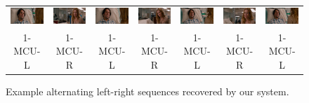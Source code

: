 \begin{figure}
\begin{center}
\begin{tabular}{c c c c c c c}

\includegraphics[width=0.11\linewidth]
  {fig/pat1/thisIs40/01.jpg}
& \includegraphics[width=0.11\linewidth]
  {fig/pat1/thisIs40/02.jpg}
& \includegraphics[width=0.11\linewidth]
  {fig/pat1/thisIs40/03.jpg}
& \includegraphics[width=0.11\linewidth]
  {fig/pat1/thisIs40/04.jpg}
& \includegraphics[width=0.11\linewidth]
  {fig/pat1/thisIs40/05.jpg}
& \includegraphics[width=0.11\linewidth]
  {fig/pat1/thisIs40/06.jpg}
& \includegraphics[width=0.11\linewidth]
  {fig/pat1/thisIs40/07.jpg}
\\
\large{1-MCU-L} & \large{1-MCU-R} 
& \large{1-MCU-L} & \large{1-MCU-R} 
& \large{1-MCU-L} & \large{1-MCU-R} 
& \large{1-MCU-L} \\

\end{tabular}
\end{center}

\caption{Example alternating left-right sequences recovered by our system.}

\label{fig:pat1}

\end{figure}

